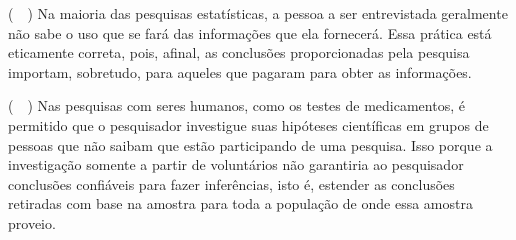 \begin{enumerate}
	\subitem (~~) Na maioria das pesquisas estatísticas, a pessoa a ser entrevistada geralmente não
sabe o uso que se fará das informações que ela fornecerá. Essa prática está
eticamente correta, pois, afinal, as conclusões proporcionadas pela pesquisa
importam, sobretudo, para aqueles que pagaram para obter as informações.
	
	\subitem (~~) Nas pesquisas com seres humanos, como os testes de medicamentos, é permitido
que o pesquisador investigue suas hipóteses científicas em grupos de pessoas que
não saibam que estão participando de uma pesquisa. Isso porque a investigação
somente a partir de voluntários não garantiria ao pesquisador conclusões confiáveis
para fazer inferências, isto é, estender as conclusões retiradas com base na amostra
para toda a população de onde essa amostra proveio.
	
\end{enumerate}



